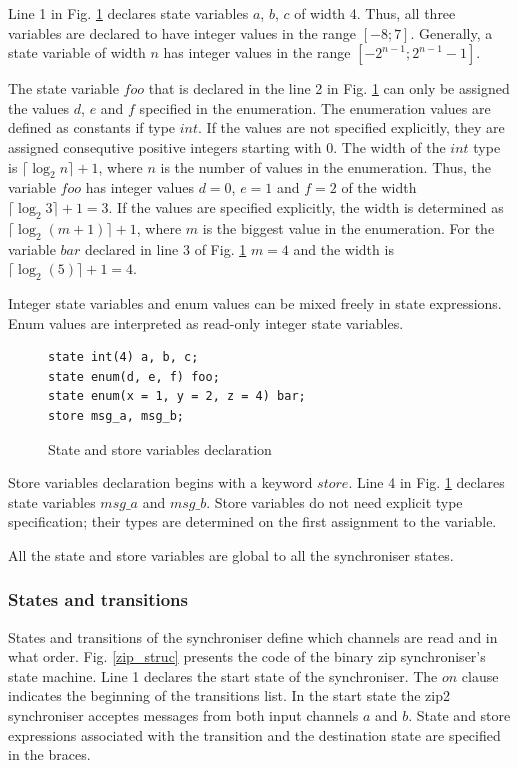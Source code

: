 Line 1 in Fig. \ref{sync_statevar} declares state variables $a$, $b$, $c$ of width 4. Thus, all three variables are declared to have integer values in the range $[-8; 7]$. Generally, a state variable of width $n$ has integer values in the range $[-2^{n-1}; 2^{n-1}-1]$.

The state variable $foo$ that is declared in the line 2 in Fig. \ref{sync_statevar} can only be assigned the values $d$, $e$ and $f$ specified in the enumeration. The enumeration values are defined as constants if type $int$. If the values are not specified explicitly, they are assigned consequtive positive integers starting with 0. The width of the $int$ type is $\lceil \log_{2}{n} \rceil + 1$, where $n$ is the number of values in the enumeration. Thus, the variable $foo$ has integer values $d=0$, $e=1$ and $f=2$ of the width $\lceil \log_{2}{3} \rceil + 1 = 3$. If the values are specified explicitly, the width is determined as $\lceil \log_{2}{(m+1)} \rceil + 1$, where $m$ is the biggest value in the enumeration. For the variable $bar$ declared in line 3 of Fig. \ref{sync_statevar} $m=4$ and the width is $\lceil \log_{2}{(5)} \rceil + 1 = 4$.

Integer state variables and enum values can be mixed freely in state expressions. Enum values are interpreted as read-only integer state variables. %

\begin{figure}[h!]
\lstset{numbers=left, numberstyle=\small, stepnumber=1, numbersep=8pt}
\begin{lstlisting}[frame=single]
state int(4) a, b, c;
state enum(d, e, f) foo;
state enum(x = 1, y = 2, z = 4) bar;
store msg_a, msg_b;
\end{lstlisting}
\caption{State and store variables declaration}
\label{sync_statevar}
\end{figure}

Store variables declaration begins with a keyword $store$. Line 4 in Fig. \ref{sync_statevar} declares state variables $msg\_a$ and $msg\_b$. Store variables do not need explicit type specification; their types are determined on the first assignment to the variable.

All the state and store variables are global to all the synchroniser states.


  \subsubsection{States and transitions}
States and transitions of the synchroniser define which channels are read and in what order. Fig. \ref{zip_struc} presents the code of the binary zip synchroniser's state machine. Line 1 declares the start state of the synchroniser. The $on$ clause indicates the beginning of the transitions list. In the start state the zip2 synchroniser acceptes messages from both input channels $a$ and $b$. State and store expressions associated with the transition and the destination state are specified in the braces.

